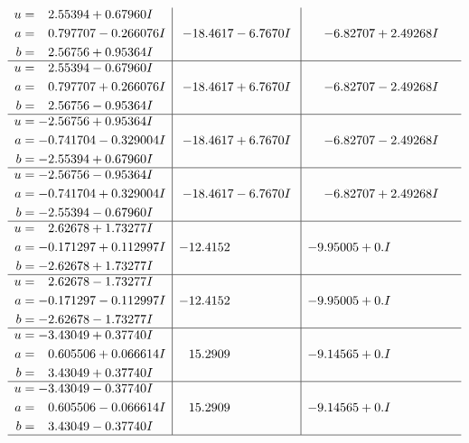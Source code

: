 \documentclass[1p]{elsarticle_modified}
\theoremstyle{definition}
\begin{document}
$$\begin{array}{c|c|c}
\begin{aligned}
u &= \phantom{-}2.55394 + 0.67960 I \\
a &= \phantom{-}0.797707 - 0.266076 I \\
b &= \phantom{-}2.56756 + 0.95364 I\end{aligned}
 & -18.4617 - 6.7670 I & -6.82707 + 2.49268 I \\ \hline\begin{aligned}
u &= \phantom{-}2.55394 - 0.67960 I \\
a &= \phantom{-}0.797707 + 0.266076 I \\
b &= \phantom{-}2.56756 - 0.95364 I\end{aligned}
 & -18.4617 + 6.7670 I & -6.82707 - 2.49268 I \\ \hline\begin{aligned}
u &= -2.56756 + 0.95364 I \\
a &= -0.741704 - 0.329004 I \\
b &= -2.55394 + 0.67960 I\end{aligned}
 & -18.4617 + 6.7670 I & -6.82707 - 2.49268 I \\ \hline\begin{aligned}
u &= -2.56756 - 0.95364 I \\
a &= -0.741704 + 0.329004 I \\
b &= -2.55394 - 0.67960 I\end{aligned}
 & -18.4617 - 6.7670 I & -6.82707 + 2.49268 I \\ \hline\begin{aligned}
u &= \phantom{-}2.62678 + 1.73277 I \\
a &= -0.171297 + 0.112997 I \\
b &= -2.62678 + 1.73277 I\end{aligned}
 & -12.4152\phantom{ +0.000000I} & -9.95005 + 0. I\phantom{ +0.000000I} \\ \hline\begin{aligned}
u &= \phantom{-}2.62678 - 1.73277 I \\
a &= -0.171297 - 0.112997 I \\
b &= -2.62678 - 1.73277 I\end{aligned}
 & -12.4152\phantom{ +0.000000I} & -9.95005 + 0. I\phantom{ +0.000000I} \\ \hline\begin{aligned}
u &= -3.43049 + 0.37740 I \\
a &= \phantom{-}0.605506 + 0.066614 I \\
b &= \phantom{-}3.43049 + 0.37740 I\end{aligned}
 & \phantom{-}15.2909\phantom{ +0.000000I} & -9.14565 + 0. I\phantom{ +0.000000I} \\ \hline\begin{aligned}
u &= -3.43049 - 0.37740 I \\
a &= \phantom{-}0.605506 - 0.066614 I \\
b &= \phantom{-}3.43049 - 0.37740 I\end{aligned}
 & \phantom{-}15.2909\phantom{ +0.000000I} & -9.14565 + 0. I\phantom{ +0.000000I}\\
 \hline 
 \end{array}$$\newpage\newpage\renewcommand{\arraystretch}{1}
\end{document}
